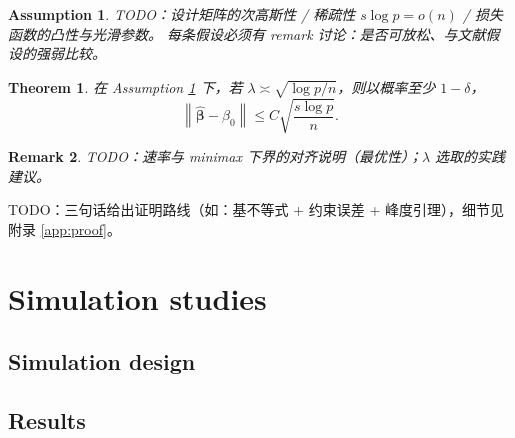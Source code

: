 \documentclass[11pt]{article}
\newtheorem{theorem}{Theorem}
\newtheorem{assumption}{Assumption}          %
\newtheorem{remark}[theorem]{Remark}
\newcommand{\betaHat}{\hat{\bm{\beta}}}
\newcommand{\norm}[1]{\left\lVert #1 \right\rVert}
\begin{document}
\begin{assumption}\label{asm:1}
TODO：设计矩阵的次高斯性 / 稀疏性 $s\log p = o(n)$ / 损失函数的凸性与光滑参数。
每条假设必须有 remark 讨论：是否可放松、与文献假设的强弱比较。
\end{assumption}

\begin{theorem}\label{thm:main}
在 Assumption \ref{asm:1} 下，若 $\lambda \asymp \sqrt{\log p/n}$，则以概率至少 $1-\delta$，
\begin{equation}\label{eq:rate}
  \norm{\betaHat-\beta_0} \le C \sqrt{\frac{s\log p}{n}}.
\end{equation}
\end{theorem}

\begin{remark}
TODO：速率与 minimax 下界的对齐说明（最优性）；$\lambda$ 选取的实践建议。
\end{remark}

\begin{pf sketch}
TODO：三句话给出证明路线（如：基不等式 + 约束误差 + 峰度引理），细节见附录 \ref{app:proof}。
\end{pf sketch}

\section{Simulation studies}\label{sec:simulation}
\subsection{Simulation design}\label{sec:simdesign}

\subsection{Results}\label{sec:simresults}

\end{document}
